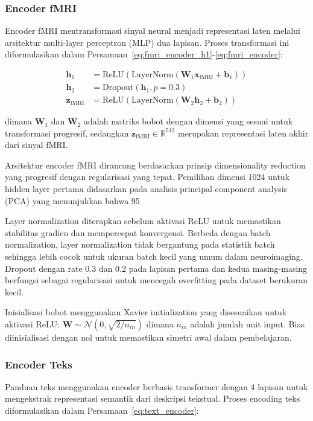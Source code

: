 \subsubsection{Encoder fMRI}
Encoder fMRI mentransformasi sinyal neural menjadi representasi laten melalui arsitektur multi-layer perceptron (MLP) dua lapisan. Proses transformasi ini diformulasikan dalam Persamaan~\ref{eq:fmri_encoder_h1}-\ref{eq:fmri_encoder}:

\begin{align}
\mathbf{h}_1 &= \text{ReLU}(\text{LayerNorm}(\mathbf{W}_1 \mathbf{x}_{\text{fMRI}} + \mathbf{b}_1)) \label{eq:fmri_encoder_h1} \\
\mathbf{h}_2 &= \text{Dropout}(\mathbf{h}_1, p=0.3) \label{eq:fmri_encoder_h2} \\
\mathbf{z}_{\text{fMRI}} &= \text{ReLU}(\text{LayerNorm}(\mathbf{W}_2 \mathbf{h}_2 + \mathbf{b}_2)) \label{eq:fmri_encoder}
\end{align}

dimana $\mathbf{W}_1$ dan $\mathbf{W}_2$ adalah matriks bobot dengan dimensi yang sesuai untuk transformasi progresif, sedangkan $\mathbf{z}_{\text{fMRI}} \in \mathbb{R}^{512}$ merupakan representasi laten akhir dari sinyal fMRI.

Arsitektur encoder fMRI dirancang berdasarkan prinsip dimensionality reduction yang progresif dengan regularisasi yang tepat. Pemilihan dimensi 1024 untuk hidden layer pertama didasarkan pada analisis principal component analysis (PCA) yang menunjukkan bahwa 95%

Layer normalization diterapkan sebelum aktivasi ReLU untuk memastikan stabilitas gradien dan mempercepat konvergensi. Berbeda dengan batch normalization, layer normalization tidak bergantung pada statistik batch sehingga lebih cocok untuk ukuran batch kecil yang umum dalam neuroimaging. Dropout dengan rate 0.3 dan 0.2 pada lapisan pertama dan kedua masing-masing berfungsi sebagai regularisasi untuk mencegah overfitting pada dataset berukuran kecil.

Inisialisasi bobot menggunakan Xavier initialization yang disesuaikan untuk aktivasi ReLU: $\mathbf{W} \sim \mathcal{N}(0, \sqrt{2/n_{in}})$ dimana $n_{in}$ adalah jumlah unit input. Bias diinisialisasi dengan nol untuk memastikan simetri awal dalam pembelajaran.

\subsubsection{Encoder Teks}
Panduan teks menggunakan encoder berbasis transformer dengan 4 lapisan untuk mengekstrak representasi semantik dari deskripsi tekstual. Proses encoding teks diformulasikan dalam Persamaan~\ref{eq:text_encoder}:

